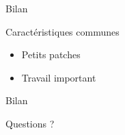 \documentclass[handout]{beamer}
\begin{document}
\begin{frame}{Bilan}
    \begin{block}{Caractéristiques communes}
        \begin{itemize}[<+->]
            \item Petits patches
            \item Travail important
        \end{itemize}
    \end{block}
\end{frame}

\begin{frame}{Bilan}
    \begin{block}{}
        Questions ?
    \end{block}
\end{frame}
\end{document}
